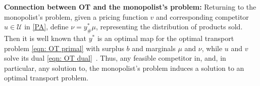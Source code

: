 \documentclass[12pt,reqno]{amsart}
\begin{document}





\textbf{Connection between OT and the monopolist's problem:}
Returning to the monopolist's problem, given a pricing function  $v$ and corresponding competitor $u \in \mathcal{U}$ in  \eqref{PA}, define $\nu =y^*_\#\mu$, representing the distribution of products sold.  Then it is well known that $y^*$ is an optimal map for the optimal transport problem \eqref{eqn: OT primal} with surplus $b$ and marginals $\mu$ and $\nu$,  while $u$ and $v$ solve its dual \eqref{eqn: OT dual}~\cite{FigalliKimMcCann11}.
Thus, any feasible competitor in, and, in particular, any solution to, the monopolist's problem induces a solution to an optimal transport problem.
\end{document}
